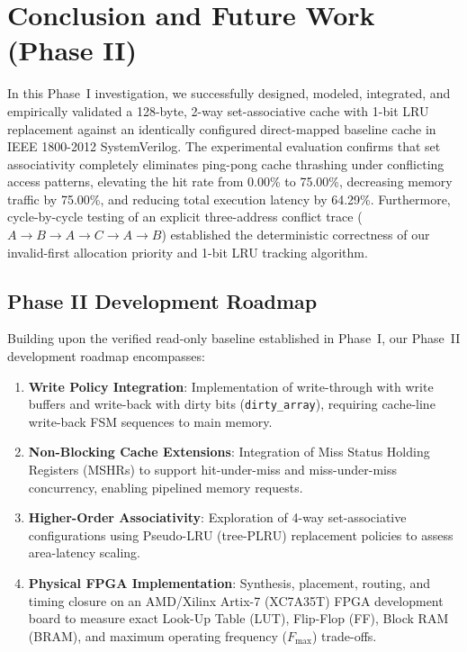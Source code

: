 \documentclass[conference]{IEEEtran}
\begin{document}
\section{Conclusion and Future Work (Phase II)}
\label{sec:conclusion}

In this Phase~I investigation, we successfully designed, modeled, integrated, and empirically validated a 128-byte, 2-way set-associative cache with 1-bit LRU replacement against an identically configured direct-mapped baseline cache in IEEE 1800-2012 SystemVerilog. The experimental evaluation confirms that set associativity completely eliminates ping-pong cache thrashing under conflicting access patterns, elevating the hit rate from 0.00\% to 75.00\%, decreasing memory traffic by 75.00\%, and reducing total execution latency by 64.29\%. Furthermore, cycle-by-cycle testing of an explicit three-address conflict trace ($A \to B \to A \to C \to A \to B$) established the deterministic correctness of our invalid-first allocation priority and 1-bit LRU tracking algorithm.

\subsection{Phase II Development Roadmap}
Building upon the verified read-only baseline established in Phase~I, our Phase~II development roadmap encompasses:
\begin{enumerate}
    \item \textbf{Write Policy Integration}: Implementation of write-through with write buffers and write-back with dirty bits (\texttt{dirty\_array}), requiring cache-line write-back FSM sequences to main memory.
    \item \textbf{Non-Blocking Cache Extensions}: Integration of Miss Status Holding Registers (MSHRs) to support hit-under-miss and miss-under-miss concurrency, enabling pipelined memory requests.
    \item \textbf{Higher-Order Associativity}: Exploration of 4-way set-associative configurations using Pseudo-LRU (tree-PLRU) replacement policies to assess area-latency scaling.
    \item \textbf{Physical FPGA Implementation}: Synthesis, placement, routing, and timing closure on an AMD/Xilinx Artix-7 (XC7A35T) FPGA development board to measure exact Look-Up Table (LUT), Flip-Flop (FF), Block RAM (BRAM), and maximum operating frequency ($F_{\max}$) trade-offs.
\end{enumerate}



\end{document}

